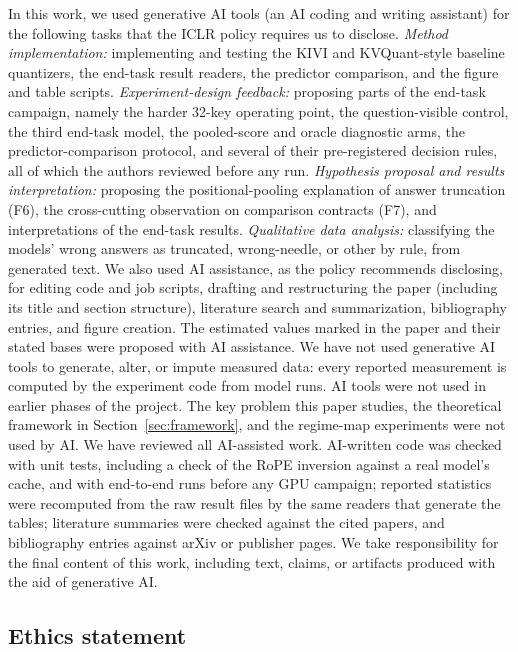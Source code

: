 \documentclass{article}
\theoremstyle{definition}
\begin{document}
In this work, we used generative AI tools (an AI coding and writing assistant) for the following tasks that the ICLR policy requires us to disclose.
\emph{Method implementation:} implementing and testing the KIVI and KVQuant-style baseline quantizers, the end-task result readers, the predictor comparison, and the figure and table scripts.
\emph{Experiment-design feedback:} proposing parts of the end-task campaign, namely the harder 32-key operating point, the question-visible control, the third end-task model, the pooled-score and oracle diagnostic arms, the predictor-comparison protocol, and several of their pre-registered decision rules, all of which the authors reviewed before any run.
\emph{Hypothesis proposal and results interpretation:} proposing the positional-pooling explanation of answer truncation (F6), the cross-cutting observation on comparison contracts (F7), and interpretations of the end-task results.
\emph{Qualitative data analysis:} classifying the models' wrong answers as truncated, wrong-needle, or other by rule, from generated text.
We also used AI assistance, as the policy recommends disclosing, for editing code and job scripts, drafting and restructuring the paper (including its title and section structure), literature search and summarization, bibliography entries, and figure creation.  The estimated values marked in the paper and their stated bases were proposed with AI assistance.
We have not used generative AI tools to generate, alter, or impute measured data: every reported measurement is computed by the experiment code from model runs.  
AI tools were not used in earlier phases of the project. The key problem this paper studies, the theoretical framework in Section~\ref{sec:framework}, and the regime-map experiments were not used by AI. 
We have reviewed all AI-assisted work.  AI-written code was checked with unit tests, including a check of the RoPE inversion against a real model's cache, and with end-to-end runs before any GPU campaign; reported statistics were recomputed from the raw result files by the same readers that generate the tables; literature summaries were checked against the cited papers, and bibliography entries against arXiv or publisher pages.  We take responsibility for the final content of this work, including text, claims, or artifacts produced with the aid of generative AI.

\subsection*{Ethics statement}
\end{document}
